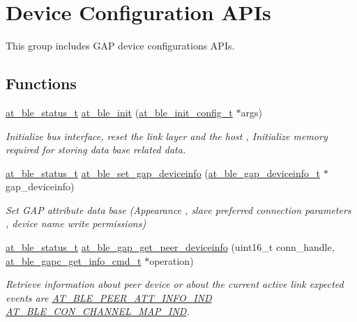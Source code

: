 \hypertarget{group__gap__dev__config__group}{}\section{Device Configuration A\+P\+Is}
\label{group__gap__dev__config__group}


This group includes G\+AP device configurations A\+P\+Is.  


\subsection*{Functions}
\begin{DoxyCompactItemize}
\item 
\mbox{\hyperlink{group__error__codes__group_ga3b1db9b95feb157b3c188ca27fe76988}{at\+\_\+ble\+\_\+status\+\_\+t}} \mbox{\hyperlink{group__gap__dev__config__group_gaa972214071cfa8767b5145eacfa03a90}{at\+\_\+ble\+\_\+init}} (\mbox{\hyperlink{structat__ble__init__config__t}{at\+\_\+ble\+\_\+init\+\_\+config\+\_\+t}} $\ast$args)
\begin{DoxyCompactList}\small\item\em Initialize bus interface, reset the link layer and the host , Initialize memory required for storing data base related data. \end{DoxyCompactList}\item 
\mbox{\hyperlink{group__error__codes__group_ga3b1db9b95feb157b3c188ca27fe76988}{at\+\_\+ble\+\_\+status\+\_\+t}} \mbox{\hyperlink{group__gap__dev__config__group_gaed47ccba87a2a4989e49243c5de5a767}{at\+\_\+ble\+\_\+set\+\_\+gap\+\_\+deviceinfo}} (\mbox{\hyperlink{structat__ble__gap__deviceinfo__t}{at\+\_\+ble\+\_\+gap\+\_\+deviceinfo\+\_\+t}} $\ast$gap\+\_\+deviceinfo)
\begin{DoxyCompactList}\small\item\em Set G\+AP attribute data base (Appearance , slave preferred connection parameters , device name write permissions) \end{DoxyCompactList}\item 
\mbox{\hyperlink{group__error__codes__group_ga3b1db9b95feb157b3c188ca27fe76988}{at\+\_\+ble\+\_\+status\+\_\+t}} \mbox{\hyperlink{group__gap__dev__config__group_gaec200b5204b2ff7c97807a32b8add91e}{at\+\_\+ble\+\_\+gap\+\_\+get\+\_\+peer\+\_\+deviceinfo}} (uint16\+\_\+t conn\+\_\+handle, \mbox{\hyperlink{structat__ble__gapc__get__info__cmd__t}{at\+\_\+ble\+\_\+gapc\+\_\+get\+\_\+info\+\_\+cmd\+\_\+t}} $\ast$operation)
\begin{DoxyCompactList}\small\item\em Retrieve information about peer device or about the current active link expected events are \mbox{\hyperlink{at__ble__api_8h_a3324640b95f33169515f89738ed5baeba5cc67ef12127d45180b4506113dce0bb}{A\+T\+\_\+\+B\+L\+E\+\_\+\+P\+E\+E\+R\+\_\+\+A\+T\+T\+\_\+\+I\+N\+F\+O\+\_\+\+I\+ND}} \mbox{\hyperlink{at__ble__api_8h_a3324640b95f33169515f89738ed5baebaf876506d3b4994cfa13ebee6b0b8496e}{A\+T\+\_\+\+B\+L\+E\+\_\+\+C\+O\+N\+\_\+\+C\+H\+A\+N\+N\+E\+L\+\_\+\+M\+A\+P\+\_\+\+I\+ND}}. \end{DoxyCompactList}\item 

\end{DoxyCompactItemize}

